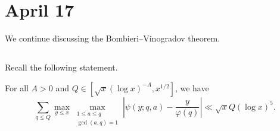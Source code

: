 \documentclass[../notes.tex]{subfiles}
\begin{document}
\section{April 17}

We continue discussing the Bombieri--Vinogradov theorem.

\subsection{}
Recall the following statement.
\begin{theorem}
	For all $A>0$ and $Q\in\left[\sqrt x(\log x)^{-A},x^{1/2}\right]$, we have
	\[\sum_{q\le Q}\max_{y\le x}\max_{\substack{1\le a\le q\\\gcd(a,q)=1}}\left|\psi(y;q,a)-\frac y{\varphi(q)}\right|\ll\sqrt xQ(\log x)^5.\]
\end{theorem}
\end{document}
